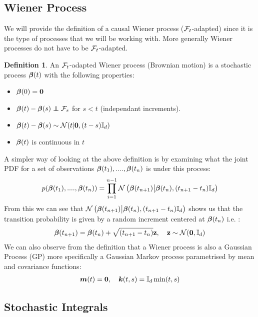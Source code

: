 \documentclass[a4paper,12pt,twoside,openright]{report}
\theoremstyle{definition}
\newtheorem{definition}{Definition}[section]
\begin{document}
\subsection{Wiener Process}

We will provide the definition of a causal Wiener process (${\mathcal{F}}_t$-adapted) since it is the type of processes that we will be working with. More generally Wiener processes do not have to be ${\mathcal{F}}_t$-adapted.
\begin{definition}
    An ${\mathcal{F}}_t$-adapted Wiener process (Brownian motion) is a stochastic process ${\bm{\beta}}(t)$ with the following properties:
    \begin{itemize}
        \item ${\bm{\beta}}(0) = {\bm{0}}$
        \item  $\rvw(t) - \rvw(s) \independent \calF_s$  for $s < t$ (independant increments).
        \item ${\bm{\beta}}(t) - {\bm{\beta}}(s) \sim {\mathcal{N}} (t | {\bm{0}},  (t - s) {\mathbb{I}_d}) $
        \item ${\bm{\beta}}(t)$ is continuous in $t$
    \end{itemize}
\end{definition}
A simpler way of looking at the above definition is by examining what the joint PDF for a set of observations ${\bm{\beta}}(t_1), ...., {\bm{\beta}}(t_n)$  is under this process:
\begin{align*}
    p({\bm{\beta}}(t_1), ...., {\bm{\beta}}(t_n)) = \prod_{i=1}^{n-1} {\mathcal{N}}\left({\bm{\beta}}(t_{n+1})\big| {\bm{\beta}}(t_{n}), (t_{n+1}- t_{n}){\mathbb{I}_d} \right)
\end{align*}
From this we can see that ${\mathcal{N}}\left({\bm{\beta}}(t_{n+1})\big| {\bm{\beta}}(t_{n}), (t_{n+1}- t_{n}){\mathbb{I}_d} \right)$ shows us that the transition probability is given by a random increment  centered at  ${\bm{\beta}}(t_{n})$ i.e. :
\begin{align*}
    {\bm{\beta}}(t_{n+1}) = {\bm{\beta}}(t_{n}) +  \sqrt{(t_{n+1}- t_{n})}{\mathbf{z}} , \quad {\mathbf{z}} \sim \mathcal{N}({\bm{0}}, {\mathbb{I}_d}) 
\end{align*}
We can also observe from the definition that a Wiener process is also a Gaussian Process (GP) more specifically a Gaussian Markov process parametrised by mean and covariance functions:
\begin{align*}
    {\bm{m}}(t) = {\bm{0}}, \quad {\bm{k}}(t, s) = {\mathbb{I}_d}\min(t, s)
\end{align*}

\subsection{Stochastic Integrals}
\end{document}
